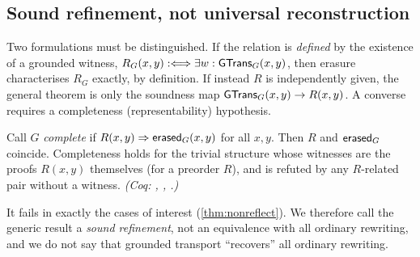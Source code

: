\subsection{Sound refinement, not universal reconstruction}
Two formulations must be distinguished. If the relation is \emph{defined} by the existence of a grounded witness, $R_G(x,y) :\Longleftrightarrow \exists w : \mathsf{GTrans}_G(x,y)$, then erasure characterises $R_G$ exactly, by definition. If instead $R$ is independently given, the general theorem is only the soundness map $\mathsf{GTrans}_G(x,y) \to R(x,y)$. A converse requires a completeness (representability) hypothesis.
\begin{prop}\label{prop:complete}
Call $G$ \emph{complete} if $R(x,y) \Rightarrow \mathsf{erased}_G(x,y)$ for all $x,y$. Then $R$ and $\mathsf{erased}_G$ coincide. Completeness holds for the trivial structure whose witnesses are the proofs $R(x,y)$ themselves (for a preorder $R$), and is refuted by any $R$-related pair without a witness. \emph{(Coq: , , .)}
\end{prop}
It fails in exactly the cases of interest (\cref{thm:nonreflect}). We therefore call the generic result a \emph{sound refinement}, not an equivalence with all ordinary rewriting, and we do not say that grounded transport ``recovers'' all ordinary rewriting.

